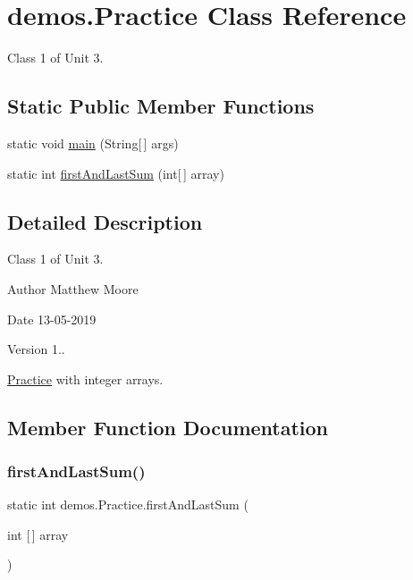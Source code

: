 \hypertarget{classdemos_1_1_practice}{}\section{demos.\+Practice Class Reference}
\label{classdemos_1_1_practice}


Class 1 of Unit 3.  


\subsection*{Static Public Member Functions}
\begin{DoxyCompactItemize}
\item 
static void \mbox{\hyperlink{classdemos_1_1_practice_a532e88a74010a5527495460a783b8a75}{main}} (String\mbox{[}$\,$\mbox{]} args)
\item 
static int \mbox{\hyperlink{classdemos_1_1_practice_a19ed9e7b2a95cdc9a8a03dc76289e6a5}{first\+And\+Last\+Sum}} (int\mbox{[}$\,$\mbox{]} array)
\end{DoxyCompactItemize}


\subsection{Detailed Description}
Class 1 of Unit 3. 

\begin{DoxyAuthor}{Author}
Matthew Moore 
\end{DoxyAuthor}
\begin{DoxyDate}{Date}
13-\/05-\/2019 
\end{DoxyDate}
\begin{DoxyVersion}{Version}
1..
\end{DoxyVersion}
\mbox{\hyperlink{classdemos_1_1_practice}{Practice}} with integer arrays. 

\subsection{Member Function Documentation}
\mbox{\label{classdemos_1_1_practice_a19ed9e7b2a95cdc9a8a03dc76289e6a5}} 
\subsubsection{\texorpdfstring{firstAndLastSum()}{firstAndLastSum()}}
{\footnotesize\ttfamily static int demos.\+Practice.\+first\+And\+Last\+Sum (\begin{DoxyParamCaption}\item[{int \mbox{[}$\,$\mbox{]}}]{array }\end{DoxyParamCaption})\hspace{0.3cm}{\ttfamily [static]}}

